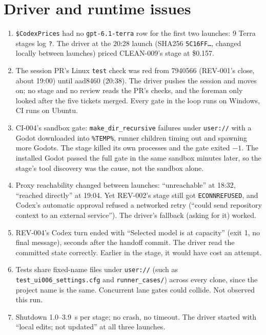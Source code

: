 \documentclass[11pt,a4paper]{article}
\begin{document}
\section*{Driver and runtime issues}

\begin{enumerate}
  \item \texttt{\$CodexPrices} had no \texttt{gpt-6.1-terra} row for the first two launches: 9
        Terra stages log \texttt{?}. The driver at the 20:28 launch (SHA256 \texttt{5C16FF\ldots},
        changed locally between launches) priced CLEAN-009's stage at \$0.157.
  \item The session PR's Linux \texttt{test} check was red from 7940566 (REV-001's close, about
        19:00) until aad8460 (20:38). The driver pushes the session and moves on; no stage and no
        review reads the PR's checks, and the foreman only looked after the five tickets merged.
        Every gate in the loop runs on Windows, CI runs on Ubuntu.
  \item CI-004's sandbox gate: \texttt{make\_dir\_recursive} failures under \texttt{user://} with a
        Godot downloaded into \texttt{\%TEMP\%}, runner children timing out and spawning more
        Godots. The stage killed its own processes and the gate exited $-1$. The installed Godot
        passed the full gate in the same sandbox minutes later, so the stage's tool discovery was
        the cause, not the sandbox alone.
  \item Proxy reachability changed between launches: ``unreachable'' at 18:32, ``reached
        directly'' at 19:04. Yet REV-002's stage still got \texttt{ECONNREFUSED}, and Codex's
        automatic approval refused a networked retry (``could send repository context to an
        external service''). The driver's fallback (asking for it) worked.
  \item REV-004's Codex turn ended with ``Selected model is at capacity'' (exit 1, no final
        message), seconds after the handoff commit. The driver read the committed state
        correctly. Earlier in the stage, it would have cost an attempt.
  \item Tests share fixed-name files under \texttt{user://} (such as
        \texttt{test\_ui006\_settings.cfg} and \texttt{runner\_cases/}) across every clone, since the
        project name is the same. Concurrent lane gates could collide. Not observed this run.
  \item Shutdown 1.0--3.9~s per stage; no crash, no timeout. The driver started with ``local
        edits; not updated'' at all three launches.
\end{enumerate}
\end{document}
